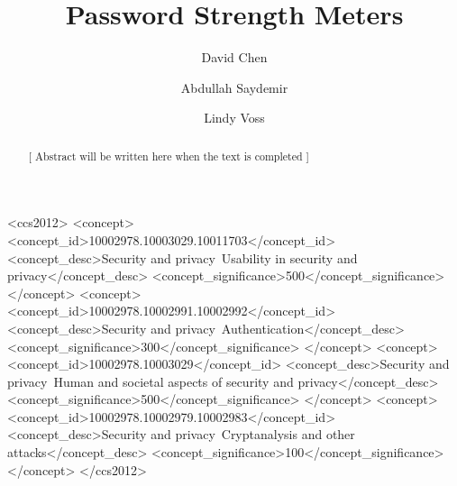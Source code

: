 \documentclass[acmsmall,nonacm]{acmart}
\begin{document}
\title{Password Strength Meters}

\author{David Chen}

\author{Abdullah Saydemir}

\author{Lindy Voss}


\renewcommand{\shortauthors}{Chen, Voss \& Saydemir}

\begin{abstract}
    \textcolor{beaver}{[ Abstract will be written here when the text is completed ]}
\end{abstract}

\begin{CCSXML}
<ccs2012>
   <concept>
       <concept_id>10002978.10003029.10011703</concept_id>
       <concept_desc>Security and privacy~Usability in security and privacy</concept_desc>
       <concept_significance>500</concept_significance>
       </concept>
   <concept>
       <concept_id>10002978.10002991.10002992</concept_id>
       <concept_desc>Security and privacy~Authentication</concept_desc>
       <concept_significance>300</concept_significance>
       </concept>
   <concept>
       <concept_id>10002978.10003029</concept_id>
       <concept_desc>Security and privacy~Human and societal aspects of security and privacy</concept_desc>
       <concept_significance>500</concept_significance>
       </concept>
   <concept>
       <concept_id>10002978.10002979.10002983</concept_id>
       <concept_desc>Security and privacy~Cryptanalysis and other attacks</concept_desc>
       <concept_significance>100</concept_significance>
       </concept>
 </ccs2012>
\end{CCSXML}
\end{document}
